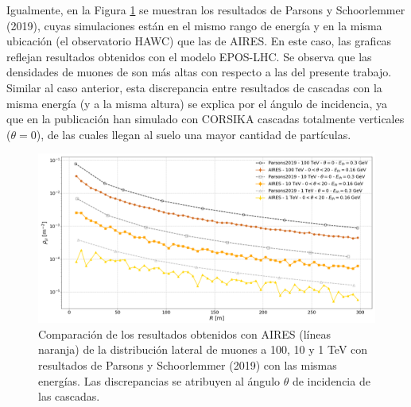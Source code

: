 Igualmente, en la Figura \ref{fig:comparacion_parsons} se muestran los resultados de Parsons y Schoorlemmer (2019), cuyas simulaciones est\'an en el mismo rango de energ\'ia y en la misma ubicaci\'on (el observatorio HAWC) \cite{Parsons2019} que las de AIRES. En este caso, las graficas reflejan resultados obtenidos con el modelo EPOS-LHC. Se observa que las densidades de muones de \cite{Parsons2019} son m\'as altas con respecto a las del presente trabajo. Similar al caso anterior, esta discrepancia entre resultados de cascadas con la misma energ\'ia (y a la misma altura) se explica por el \'angulo de incidencia, ya que en la publicaci\'on han simulado con CORSIKA cascadas totalmente verticales ($\theta=0$), de las cuales llegan al suelo una mayor cantidad de part\'iculas.\\
	\begin{figure}[] 
	\includegraphics[width=\textwidth]{Figuras/comparacion_parsons2019}
	\caption{Comparaci\'on de los resultados obtenidos con AIRES (l\'ineas naranja) de la distribuci\'on lateral de muones a 100, 10 y 1 TeV con resultados de Parsons y Schoorlemmer (2019) \cite{Parsons2019} con las mismas energ\'ias. Las discrepancias se atribuyen al \'angulo $\theta$ de incidencia de las cascadas.}
	\label{fig:comparacion_parsons}
	\end{figure}	
	
